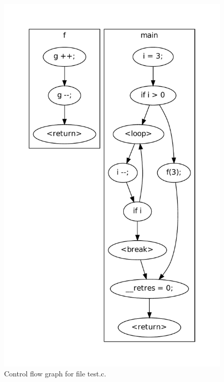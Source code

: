 \begin{figure}[htbp]
  \centering
  \begin{minipage}[h]{0.47\linewidth}
  \end{minipage}%
  \begin{minipage}[h]{0.4\linewidth}
    \includegraphics[width=\textwidth]{./tutorial/viewcfg/pdfs/cfg.pdf}
  \end{minipage}

  \caption{Control flow graph for file test.c.}
  \label{fig:tut:basiccfg}
\end{figure}

